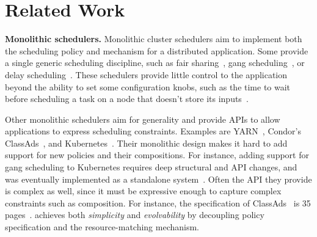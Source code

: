 \section{Related Work}
\label{sec:related-work}





\textbf{Monolithic schedulers.}
Monolithic cluster schedulers aim to implement both the scheduling policy and mechanism for a distributed application.
Some provide a single generic scheduling discipline, such as fair sharing~\cite{isard2009quincy,ghodsi2011dominant}, gang scheduling~\cite{mpi}, or delay scheduling~\cite{delay-scheduling}. These schedulers provide little control to the application beyond the ability to set some configuration knobs, such as the time to wait before scheduling a task on a node that doesn't store its inputs~\cite{delay-scheduling}.

Other monolithic schedulers aim for generality and provide APIs to allow applications to express scheduling constraints.
Examples are YARN~\cite{yarn}, Condor's ClassAds~\cite{condor}, and Kubernetes~\cite{kubernetes}.
Their monolithic design makes it hard to add support for new policies and their compositions.
For instance, adding support for gang scheduling to Kubernetes requires deep structural and API changes, and was eventually implemented as a standalone system~\cite{kubernetes-gang-scheduling}.
Often the API they provide is complex as well, since it must be expressive enough to capture complex constraints such as composition. 
For instance, the specification of ClassAds~\cite{classads} is 35 pages~\cite{classads-refman}.
\name{} achieves both \textit{simplicity} and \textit{evolvability} by decoupling policy specification and the resource-matching mechanism.

